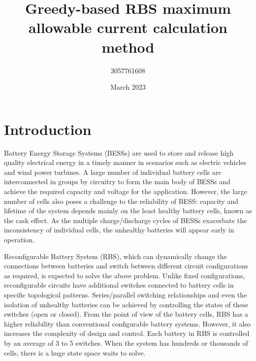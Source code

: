 \documentclass{article}
\title{Greedy-based RBS maximum allowable current calculation method}
\author{3057761608 }
\date{March 2023}
\begin{document}
\maketitle

\section{Introduction}

Battery Energy Storage Systems (BESSs) are used to store and release high quality electrical energy in a timely manner in scenarios such as electric vehicles and wind power turbines.
A large number of individual battery cells are interconnected in groups by circuitry to form the main body of BESSs and achieve the required capacity and voltage for the application. 
However, the large number of cells also poses a challenge to the reliability of BESS: capacity and lifetime of the system depends mainly on the least healthy battery cells, known as the cask effect. 
As the multiple charge/discharge cycles of BESSs exacerbate the inconsistency of individual cells, the unhealthy batteries will appear early in operation.


Reconfigurable Battery System (RBS), which can dynamically change the connections between batteries and switch between different circuit configurations as required, is expected to solve the above problem. 
Unlike fixed configurations, reconfigurable circuits have additional switches connected to battery cells in specific topological patterns. 
Series/parallel switching relationships and even the isolation of unhealthy batteries can be achieved by controlling the states of these switches (open or closed). 
From the point of view of the battery cells, RBS has a higher reliability than conventional configurable battery systems. 
However, it also increases the complexity of design and control.
Each battery in RBS is controlled by an average of 3 to 5 switches. When the system has hundreds or thousands of cells, there is a huge state space waits to solve.
\end{document}
